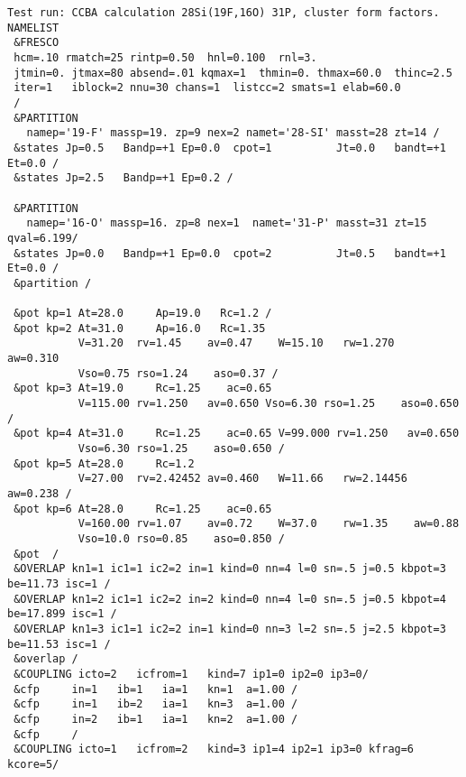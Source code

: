 \documentclass[11pt]{article}
\begin{document}
{\small
\begin{verbatim}
Test run: CCBA calculation 28Si(19F,16O) 31P, cluster form factors.
NAMELIST
 &FRESCO
 hcm=.10 rmatch=25 rintp=0.50  hnl=0.100  rnl=3.
 jtmin=0. jtmax=80 absend=.01 kqmax=1  thmin=0. thmax=60.0  thinc=2.5
 iter=1   iblock=2 nnu=30 chans=1  listcc=2 smats=1 elab=60.0
 /
 &PARTITION
   namep='19-F' massp=19. zp=9 nex=2 namet='28-SI' masst=28 zt=14 /
 &states Jp=0.5   Bandp=+1 Ep=0.0  cpot=1          Jt=0.0   bandt=+1 Et=0.0 /
 &states Jp=2.5   Bandp=+1 Ep=0.2 /

 &PARTITION
   namep='16-O' massp=16. zp=8 nex=1  namet='31-P' masst=31 zt=15 qval=6.199/
 &states Jp=0.0   Bandp=+1 Ep=0.0  cpot=2          Jt=0.5   bandt=+1 Et=0.0 /
 &partition /

 &pot kp=1 At=28.0     Ap=19.0   Rc=1.2 /
 &pot kp=2 At=31.0     Ap=16.0   Rc=1.35
           V=31.20  rv=1.45    av=0.47    W=15.10   rw=1.270   aw=0.310
           Vso=0.75 rso=1.24    aso=0.37 /
 &pot kp=3 At=19.0     Rc=1.25    ac=0.65
           V=115.00 rv=1.250   av=0.650 Vso=6.30 rso=1.25    aso=0.650 /
 &pot kp=4 At=31.0     Rc=1.25    ac=0.65 V=99.000 rv=1.250   av=0.650
           Vso=6.30 rso=1.25    aso=0.650 /
 &pot kp=5 At=28.0     Rc=1.2
           V=27.00  rv=2.42452 av=0.460   W=11.66   rw=2.14456 aw=0.238 /
 &pot kp=6 At=28.0     Rc=1.25    ac=0.65
           V=160.00 rv=1.07    av=0.72    W=37.0    rw=1.35    aw=0.88
           Vso=10.0 rso=0.85    aso=0.850 /
 &pot  /
 &OVERLAP kn1=1 ic1=1 ic2=2 in=1 kind=0 nn=4 l=0 sn=.5 j=0.5 kbpot=3 be=11.73 isc=1 /
 &OVERLAP kn1=2 ic1=1 ic2=2 in=2 kind=0 nn=4 l=0 sn=.5 j=0.5 kbpot=4 be=17.899 isc=1 /
 &OVERLAP kn1=3 ic1=1 ic2=2 in=1 kind=0 nn=3 l=2 sn=.5 j=2.5 kbpot=3 be=11.53 isc=1 /
 &overlap /
 &COUPLING icto=2   icfrom=1   kind=7 ip1=0 ip2=0 ip3=0/
 &cfp     in=1   ib=1   ia=1   kn=1  a=1.00 /
 &cfp     in=1   ib=2   ia=1   kn=3  a=1.00 /
 &cfp     in=2   ib=1   ia=1   kn=2  a=1.00 /
 &cfp     /
 &COUPLING icto=1   icfrom=2   kind=3 ip1=4 ip2=1 ip3=0 kfrag=6 kcore=5/
\end{verbatim}
}
\newpage
\end{document}
